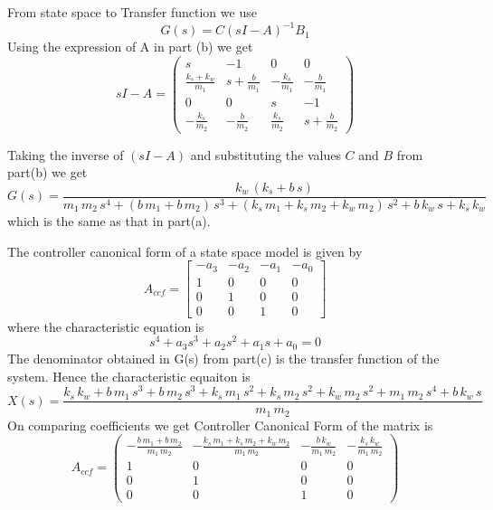 \documentclass{article}
\newenvironment{answer}[2][Answer]{\begin{trivlist}
  \item[\hskip \labelsep {\bfseries #1}\hskip \labelsep {\bfseries #2:}]}{\end{trivlist}}
\begin{document}
\begin{answer}c
  From state space to Transfer function we use
  $$G(s) = C(sI - A)^{-1}B_1$$
  Using the expression of A in part (b) we get
  $$sI - A = \left(\begin{array}{cccc} s & -1 & 0 & 0\\ \frac{k_{s} + k_{w}}{m_{1}} & s + \frac{b}{m_{1}} & -\frac{k_{s}}{m_{1}} & -\frac{b}{m_{1}}\\ 0 & 0 & s & -1\\ -\frac{k_{s}}{m_{2}} & -\frac{b}{m_{2}} & \frac{k_{s}}{m_{2}} & s + \frac{b}{m_{2}} \end{array}\right)$$

  Taking the inverse of $(sI - A)$ and substituting the values $C$ and $B$ from part(b) we get
  $$G(s) = \frac{k_{w}\, \left(k_{s} + b\, s\right)}{m_{1}\, m_{2}\, s^4 + \left(b\, m_{1} + b\, m_{2}\right)\, s^3 + \left(k_{s}\, m_{1} + k_{s}\, m_{2} + k_{w}\, m_{2}\right)\, s^2 + b\, k_{w}\, s + k_{s}\, k_{w}}$$
  which is the same as that in part(a).

\end{answer}

\begin{answer}d
  The controller canonical form of a state space model is given by
  \[
    A_{ccf} =
    \begin{bmatrix}
      -a_3 & -a_2 & -a_1 & -a_0\\
      1 & 0 & 0 & 0\\
      0 & 1 & 0 & 0\\
      0 & 0 & 1 & 0
    \end{bmatrix}
  \]
  where the characteristic equation is
  $$s^4 + a_3s^3 + a_2 s^2 + a_1 s + a_0 = 0$$
  The denominator obtained in G(s) from part(c) is the transfer function of the system. Hence the characteristic equaiton is
  $$X(s) = \frac{k_{s}\, k_{w} + b\, m_{1}\, s^3 + b\, m_{2}\, s^3 + k_{s}\, m_{1}\, s^2 + k_{s}\, m_{2}\, s^2 + k_{w}\, m_{2}\, s^2 + m_{1}\, m_{2}\, s^4 + b\, k_{w}\, s}{m_{1}\, m_{2}}$$
  On comparing coefficients we get Controller Canonical Form of the matrix is
  $$A_{ccf} = \left(\begin{array}{cccc} -\frac{b\, m_{1} + b\, m_{2}}{m_{1}\, m_{2}} & -\frac{k_{s}\, m_{1} + k_{s}\, m_{2} + k_{w}\, m_{2}}{m_{1}\, m_{2}} & -\frac{b\, k_{w}}{m_{1}\, m_{2}} & -\frac{k_{s}\, k_{w}}{m_{1}\, m_{2}}\\ 1 & 0 & 0 & 0\\ 0 & 1 & 0 & 0\\ 0 & 0 & 1 & 0 \end{array}\right)$$
\end{answer}
\end{document}
